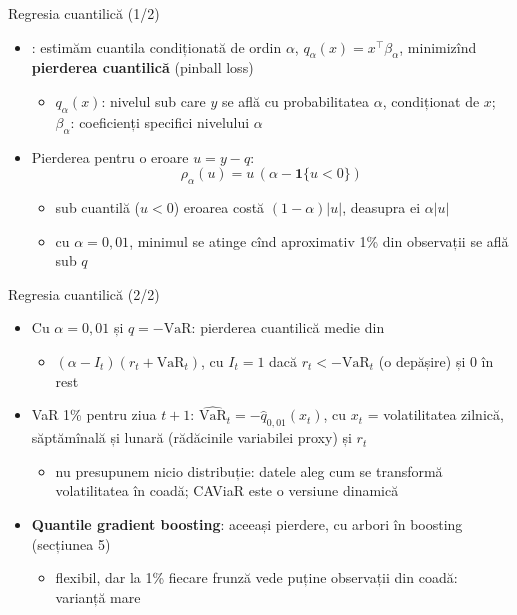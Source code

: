 \begin{frame}{Regresia cuantilică (1/2)}
\itemsize{\small}
\begin{itemize}
    \item {}: estimăm cuantila condiționată de ordin $\alpha$, $q_\alpha(x) = x^\top\beta_\alpha$, minimizînd \textbf{pierderea cuantilică} (pinball loss)
    \begin{itemize}
        \item $q_\alpha(x)$: nivelul sub care $y$ se află cu probabilitatea $\alpha$, condiționat de $x$; $\beta_\alpha$: coeficienți specifici nivelului $\alpha$
    \end{itemize}
    \item Pierderea pentru o eroare $u = y - q$: \[ \rho_\alpha(u) = u\,(\alpha - \mathbf{1}\{u < 0\}) \]
    \begin{itemize}
        \item sub cuantilă ($u < 0$) eroarea costă $(1 - \alpha)|u|$, deasupra ei $\alpha|u|$
        \item cu $\alpha = 0{,}01$, minimul se atinge cînd aproximativ 1\% din observații se află sub $q$
    \end{itemize}
\end{itemize}
\end{frame}

\begin{frame}{Regresia cuantilică (2/2)}
\itemsize{\small}
\begin{itemize}
    \item Cu $\alpha = 0{,}01$ și $q = -\mathrm{VaR}$: pierderea cuantilică medie din 
    \begin{itemize}
        \item $(\alpha - I_t)(r_t + \mathrm{VaR}_t)$, cu $I_t = 1$ dacă $r_t < -\mathrm{VaR}_t$ (o depășire) și 0 în rest
    \end{itemize}
    \item VaR 1\% pentru ziua $t + 1$: $\widehat{\mathrm{VaR}}_t = -\hat q_{0{,}01}(x_t)$, cu $x_t$ = volatilitatea zilnică, săptămînală și lunară (rădăcinile variabilei proxy) și $r_t$
    \begin{itemize}
        \item nu presupunem nicio distribuție: datele aleg cum se transformă volatilitatea în coadă; CAViaR  este o versiune dinamică
    \end{itemize}
    \item \textbf{Quantile gradient boosting}: aceeași pierdere, cu arbori în boosting (secțiunea 5)
    \begin{itemize}
        \item flexibil, dar la 1\% fiecare frunză vede puține observații din coadă: varianță mare
    \end{itemize}
\end{itemize}
\end{frame}

